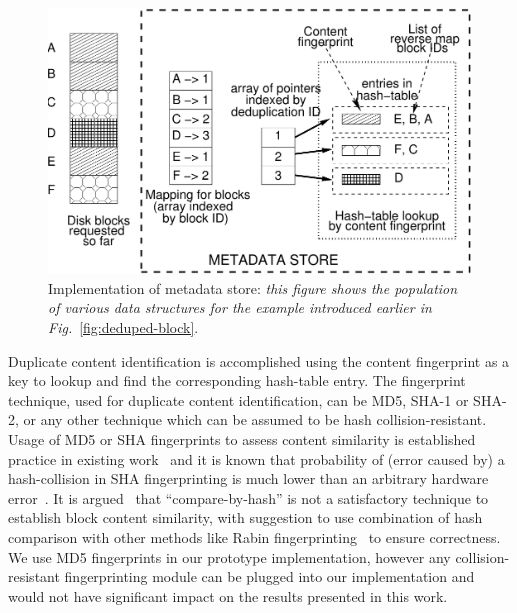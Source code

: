 \begin{figure}[t]
    \centering
    \includegraphics[scale=0.7]{confided-figures/main/metadata-structure.pdf}
    \vspace{-0.1in}
    \caption{Implementation of metadata store: \textit{this figure shows
			the population of various data structures for the example
			introduced earlier in Fig.}~\ref{fig:deduped-block}.}%
    \label{fig:metadata-structure}
\end{figure}

Duplicate content identification is accomplished using the content fingerprint 
as a key to lookup and find the corresponding hash-table entry.
The fingerprint technique, used for duplicate content identification,
can be MD5\cite{md5}, SHA-1\cite{sha1} or SHA-2\cite{sha2},
or any other technique which can be assumed to be hash collision-resistant.
Usage of MD5 or SHA fingerprints to assess content similarity is established
practice in existing work~\cite{similarity, iodedup, idedup, lbfs, venti}
and it is known that probability of (error caused by) a hash-collision in
SHA fingerprinting is much lower than an arbitrary hardware
error~\cite{compare-by-hash}.
It is argued~\cite{compare-by-hash} that ``compare-by-hash''
is not a satisfactory technique to establish block content similarity, with
suggestion to use combination of hash comparison with other methods
like Rabin fingerprinting~\cite{rabin} to ensure correctness.
We use MD5 fingerprints in our prototype implementation, %
however any collision-resistant fingerprinting module can be plugged
into our implementation and would not have significant impact on the
results presented in this work.


